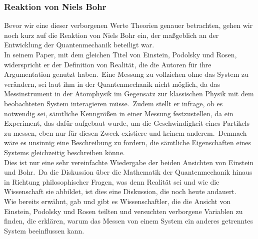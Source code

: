 \subsubsection{Reaktion von Niels Bohr}
\label{subsubsec:reaktion_von_niels_bohr}
Bevor wir eine dieser verborgenen Werte Theorien genauer betrachten, gehen wir noch kurz auf die Reaktion von Niels Bohr ein, der maßgeblich an der Entwicklung der Quantenmechanik beteiligt war.\\
In seinem Paper, mit dem gleichen Titel von Einstein, Podolsky und Rosen, widerspricht er der Definition von Realität, die die Autoren für ihre Argumentation genutzt haben.\ Eine Messung zu vollziehen
ohne das System zu verändern, sei laut ihm in der Quantenmechanik nicht möglich, da das Messinstrument in der Atomphysik im Gegensatz zur klassischen Physik mit dem beobachteten System interagieren müsse.\
Zudem stellt er infrage, ob es notwendig sei, sämtliche Kenngrößen in einer Messung festzustellen, da ein Experiment, das dafür aufgebaut wurde, um die Geschwindigkeit eines Partikels zu messen, eben nur für diesen Zweck
existiere und keinem anderem.\ Demnach wäre es unsinnig eine Beschreibung zu fordern, die sämtliche Eigenschaften eines Systems gleichzeitig beschreiben könne.\\
Dies ist nur eine sehr vereinfachte Wiedergabe der beiden Ansichten von Einstein und Bohr.\ Da die Diskussion über die Mathematik der Quantenmechanik hinaus in Richtung philosophischer Fragen, was denn Realität sei und wie die Wissenschaft sie abbildet, ist dies eine Diskussion, die noch heute andauert.\\
Wie bereits erwähnt, gab und gibt es Wissenschaftler, die die Ansicht von Einstein, Podolsky und Rosen teilten und versuchten verborgene Variablen zu finden, die erklären, warum das Messen von einem System ein anderes getrenntes System beeinflussen kann.\\

